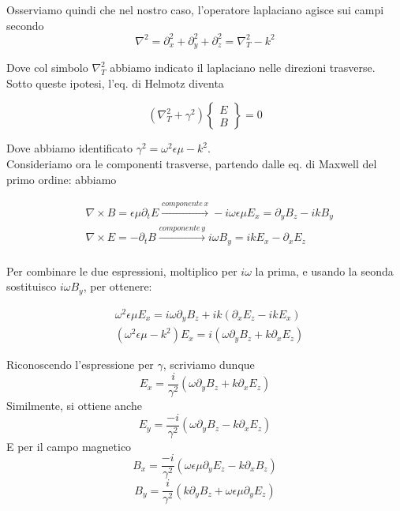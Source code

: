 \documentclass{report}
\begin{document}
    Osserviamo quindi che nel nostro caso, l'operatore laplaciano agisce sui campi secondo 
    \begin{equation}
        \nabla^2 = \partial_x^2 + \partial_y^2 + \partial_z^2 = \nabla_T^2 - k^2
    \end{equation}

    Dove col simbolo $\nabla^2_T$ abbiamo indicato il laplaciano nelle direzioni trasverse. Sotto queste ipotesi, l'eq. di Helmotz diventa 

    \begin{equation}
        \left(\nabla_T^2 + \gamma^2 \right) \left\{\begin{matrix}
            E \\ B 
        \end{matrix} \right\}
         = 0
    \end{equation}

    Dove abbiamo identificato $\gamma^2 = \omega^2\epsilon\mu - k^2$. \\

    Consideriamo ora le componenti trasverse, partendo dalle eq. di Maxwell del primo ordine: abbiamo 

    \begin{align}
        &\nabla \times B = \epsilon\mu \partial_t  E \xrightarrow{componente \, x} -i\omega \epsilon\mu E_x = \partial_y B_z -ikB_y  \\
        &\nabla \times E = -\partial_tB \xrightarrow{componente \, y} i\omega B_y= ikE_x  -\partial_xE_z \\
    \end{align}

    Per combinare le due espressioni, moltiplico per $i\omega$ la prima, e usando la seonda sostituisco $i\omega B_y$, per ottenere: 

    \begin{align}
        &\omega^2 \epsilon\mu E_x= i\omega \partial_y B_z +ik(\partial_xE_z -ikE_x) \\ &(\omega^2 \epsilon\mu- k^2)E_x = i (\omega \partial_yB_z + k\partial_xE_z)
    \end{align}

    Riconoscendo l'espressione per $\gamma$, scriviamo dunque 
    \begin{equation}
        E_x = \frac{i}{\gamma^2}(\omega \partial_yB_z + k\partial_xE_z)
    \end{equation}
    Similmente, si ottiene anche 
    \begin{equation}
        E_y = \frac{-i}{\gamma^2}(\omega \partial_yB_z - k\partial_xE_z)
    \end{equation}
    E per il campo magnetico 
    \begin{equation}
        B_x = \frac{-i}{\gamma^2}(\omega \epsilon\mu\partial_yE_z - k\partial_xB_z)
    \end{equation}
    \begin{equation}
        B_y = \frac{i}{\gamma^2}(k \partial_yB_z + \omega\epsilon\mu\partial_yE_z)
    \end{equation}
    
\end{document}
